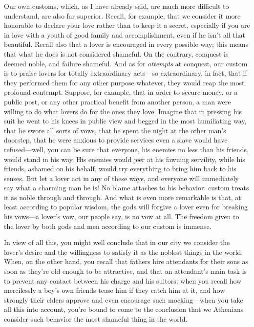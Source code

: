 Our own customs, which, as I have already said, are much more difficult
to understand, are also far superior. Recall, for example, that we
consider it more honorable to declare your love rather than to keep it a
secret, especially if you are in love with a youth of good family and
accomplishment, even if he isn’t all that beautiful. Recall also that a
lover is encouraged in every possible way; this means that what he does
is not considered shameful. On the contrary, conquest is deemed noble,
and failure shameful.  And as for {\em attempts} at conquest, our
custom is to praise lovers for totally extraordinary acts---so
extraordinary, in fact, that if they performed them  for
any other purpose whatever, they would reap the most profound contempt.
Suppose, for example, that in order to secure money, or a public post,
or any other practical benefit from another person, a man were willing
to do what lovers do for the ones they love. Imagine that in pressing
his suit he went to his knees in public view and begged in the most
humiliating way, that he swore all sorts of vows, that he spent the
night at the other man’s doorstep, that he were anxious to provide
services even a slave would have refused---well, you can be sure that
everyone, his enemies no less than his friends, would stand in his way.
His enemies would jeer at  his fawning servility, while his
friends, ashamed on his behalf, would try everything to bring him back
to his senses. But let a lover act in any of these ways, and everyone
will immediately say what a charming man he is! No blame attaches to his
behavior: custom treats it as noble through and through. And what is
even more remarkable is that, at least according to popular wisdom, the
gods will forgive a lover even for breaking his vows---a lover’s vow,
our people say, is no vow at all. The freedom given  to the lover
by both gods and men according to our custom is immense.

In view of all this, you might well conclude that in our city we
consider the lover’s desire and the willingness to satisfy it as the
noblest things in the world. When, on the other hand, you recall that
fathers hire attendants for their sons as soon as they’re old enough to
be attractive, and that an attendant’s main task is to prevent any
contact between his charge and his suitors; when you recall how
mercilessly a boy’s own friends tease him if they catch him at it, and
how strongly their elders approve and  even encourage such
mocking---when you take all this into account, you’re bound to come to
the conclusion that we Athenians consider such behavior the most
shameful thing in the world.

